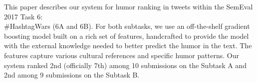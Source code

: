 This paper describes our system for humor ranking in tweets within the SemEval 2017 Task 6: \\#HashtagWars (6A and 6B). For both subtasks, we use an off-the-shelf gradient boosting model built on a rich set of features, handcrafted to provide the model with the external knowledge needed to better predict the humor in the text. The features capture various cultural references and specific humor patterns. Our system ranked 2nd (officially 7th) among 10 submissions on the Subtask A and 2nd among 9 submissions on the Subtask B.
